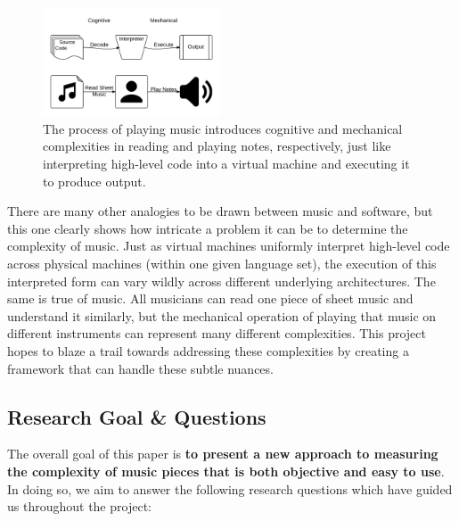 \documentclass[10pt,preprint]{sigplanconf}
\begin{document}
{\begin{figure}[ht!]
	\centering
		\includegraphics[width=0.47\textwidth]{CognitiveMechanical.png}
		\caption{The process of playing music introduces cognitive and mechanical complexities in reading and playing notes, respectively, just like interpreting high-level code into a virtual machine and executing it to produce output.}
		\label{image:complexities}
\end{figure} 

There are many other analogies to be drawn between music and software, but this one clearly shows how intricate a problem it can be to determine the complexity of music. Just as virtual machines uniformly interpret high-level code across physical machines (within one given language set), the execution of this interpreted form can vary wildly across different underlying architectures. The same is true of music. All musicians can read one piece of sheet music and understand it similarly, but the mechanical operation of playing that music on different instruments can represent many different complexities. This project hopes to blaze a trail towards addressing these complexities by creating a framework that can handle these subtle nuances.


\subsection{Research Goal \& Questions} 
\label{sec:rqg}

The overall goal of this paper is \textbf{to present a new approach to measuring the complexity of music pieces that is both objective and easy to use}. In doing so, we aim to answer the following research questions which have guided us throughout the project:

}
\end{document}
